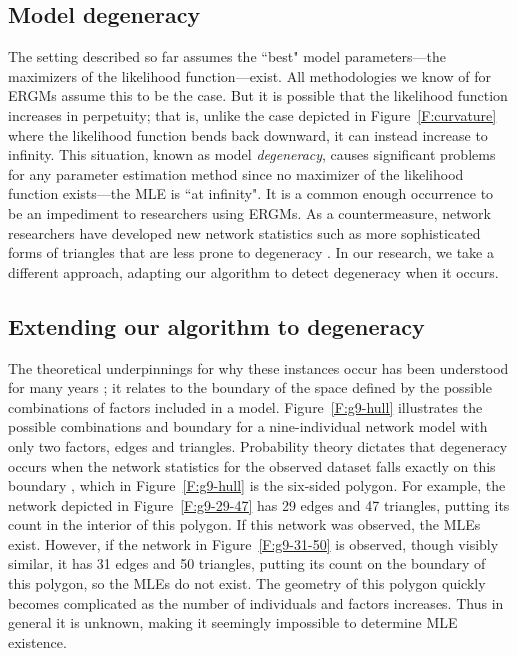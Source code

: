 \documentclass[12pt]{article}
\begin{document}
\subsection{Model degeneracy}
The setting described so far assumes the ``best" model parameters---the 
maximizers of the likelihood function---exist.  All methodologies we know of
for ERGMs assume this to be the case.
But it is possible that the likelihood function increases in perpetuity;
that is, unlike the case depicted in Figure~\ref{F:curvature} where 
the likelihood function bends back downward, it can instead 
increase to infinity.  This situation, known as model \emph{degeneracy}, 
causes significant problems for any parameter estimation method since 
no maximizer of the likelihood function exists---the MLE
is ``at infinity".  It is a common enough occurrence to be an impediment to 
researchers using ERGMs.
As a countermeasure, network researchers have developed
 new network statistics such as more sophisticated forms of triangles that are 
less prone to degeneracy \citep{advancesp*,recentp*}.
In our research, we take a different approach, adapting our algorithm to detect 
 degeneracy when it occurs.

\subsection{Extending our algorithm to degeneracy}
The theoretical underpinnings for why these instances occur has been 
understood for many years \citep[Chapter 9]{Barndorff}; it relates to the
boundary of the space defined by the 
possible combinations of factors included in a model.
Figure~\ref{F:g9-hull} illustrates the possible combinations and boundary
for a nine-individual network model with only two factors, edges and triangles.  
Probability theory dictates that degeneracy occurs when 
the network statistics for the observed dataset 
falls exactly on this boundary \citep{Handcock:degeneracy,Rinaldo:2009,Geyer:gdor},
which in Figure~\ref{F:g9-hull} is the six-sided polygon.  For example,
the network depicted in Figure~\ref{F:g9-29-47} has 29 edges and 47 triangles, putting 
its count in the
interior of this polygon.  If this network was observed, the MLEs exist.  However, if
the network in Figure~\ref{F:g9-31-50} is observed, though visibly similar, 
it has 31 edges and 50 triangles, putting its count on 
the boundary of this polygon, so the MLEs do not exist.   
The geometry of this polygon quickly becomes 
complicated as the number of individuals and factors increases.  Thus in general it is unknown,
making it seemingly impossible to determine MLE existence.
\end{document}
